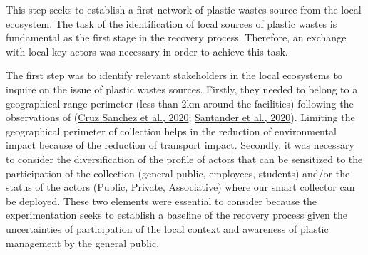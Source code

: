 \documentclass[
  11pt,
]{article}
\begin{document}
This step seeks to establish a first network of plastic wastes source
from the local ecosystem. The task of the identification of local
sources of plastic wastes is fundamental as the first stage in the
recovery process. Therefore, an exchange with local key actors was
necessary in order to achieve this task.

The first step was to identify relevant stakeholders in the local
ecosystems to inquire on the issue of plastic wastes sources. Firstly,
they needed to belong to a geographical range perimeter (less than 2km
around the facilities) following the observations of
(\protect\hyperlink{ref-CruzSanchez2020}{Cruz Sanchez et al., 2020};
\protect\hyperlink{ref-Santander2020}{Santander et al., 2020}). Limiting
the geographical perimeter of collection helps in the reduction of
environmental impact because of the reduction of transport impact.
Secondly, it was necessary to consider the diversification of the
profile of actors that can be sensitized to the participation of the
collection (general public, employees, students) and/or the status of
the actors (Public, Private, Associative) where our smart collector can
be deployed. These two elements were essential to consider because the
experimentation seeks to establish a baseline of the recovery process
given the uncertainties of participation of the local context and
awareness of plastic management by the general public.
\end{document}
